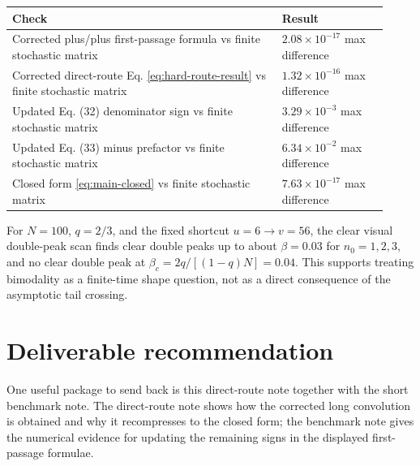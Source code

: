 \documentclass[11pt]{article}
\begin{document}
\begin{center}
\small
\begin{tabular}{@{}p{0.66\linewidth}p{0.26\linewidth}@{}}
\toprule
Check & Result \\
\midrule
Corrected plus/plus first-passage formula vs finite stochastic matrix
& \(2.08\times10^{-17}\) max difference \\
Corrected direct-route Eq. \eqref{eq:hard-route-result} vs finite stochastic matrix
& \(1.32\times10^{-16}\) max difference \\
Updated Eq. (32) denominator sign vs finite stochastic matrix
& \(3.29\times10^{-3}\) max difference \\
Updated Eq. (33) minus prefactor vs finite stochastic matrix
& \(6.34\times10^{-2}\) max difference \\
Closed form \eqref{eq:main-closed} vs finite stochastic matrix
& \(7.63\times10^{-17}\) max difference \\
\bottomrule
\end{tabular}
\normalsize
\end{center}

For \(N=100\), \(q=2/3\), and the fixed shortcut \(u=6\to v=56\), the clear
visual double-peak scan finds clear double peaks up to about \(\beta=0.03\) for
\(n_0=1,2,3\), and no clear double peak at
\(\beta_c=2q/[(1-q)N]=0.04\).  This supports treating bimodality as a
finite-time shape question, not as a direct consequence of the asymptotic tail
crossing.

\section*{Deliverable recommendation}

One useful package to send back is this direct-route note together with the
short benchmark note.  The direct-route note shows how the corrected long
convolution is obtained and why it recompresses to the closed form; the
benchmark note gives the numerical evidence for updating the remaining signs in
the displayed first-passage formulae.
\end{document}
